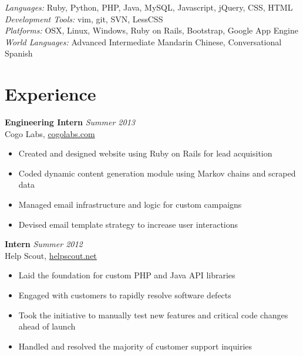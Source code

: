 \documentclass[margin,line]{resume}
\begin{document}
\begin{resume}
	\textsl{Languages:} Ruby, Python, PHP, Java, MySQL, Javascript, jQuery, CSS, HTML\vspace{1mm}\\%
	\textsl{Development Tools:} vim, git, SVN, LessCSS\vspace{1mm}\\%
	\textsl{Platforms:} OSX, Linux, Windows, Ruby on Rails, Bootstrap, Google App Engine\vspace{1mm}\\%
	\textsl{World Languages:} Advanced Intermediate Mandarin Chinese, Conversational Spanish\vspace{-2mm}\\%
    \section{\mysidestyle Experience}

	\textbf{Engineering Intern} \hfill \textsl{Summer 2013}\vspace{1mm}\\%
	Cogo Labs, \href{http://cogolabs.com}{cogolabs.com}\vspace{0mm}\\\vspace{-2mm}%
	\begin{itemize}
	\item Created and designed website using Ruby on Rails for lead acquisition
	\item Coded dynamic content generation module using Markov chains and scraped data
	\item Managed email infrastructure and logic for custom campaigns
	\item Devised email template strategy to increase user interactions
	\end{itemize}

    	\textbf{Intern} \hfill \textsl{Summer 2012}\vspace{1mm}\\%
	Help Scout, \href{https://helpscout.net}{helpscout.net}\vspace{0mm}\\\vspace{-2mm}%
	\begin{itemize}
	\item Laid the foundation for custom PHP and Java API libraries
	\item Engaged with customers to rapidly resolve software defects
	\item Took the initiative to manually test new features and critical code changes ahead of launch
	\item Handled and resolved the majority of customer support inquiries
	\end{itemize}
	

\end{resume}
\end{document}
